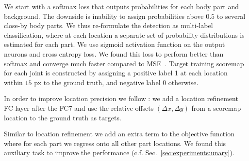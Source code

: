 We start with a softmax loss that outputs probabilities for each body
part and background. The downside is inability
to assign probabilities above $0.5$ to several close-by body parts. We
thus re-formulate the detection as multi-label classification, where
at each location a separate set of probability distributions is
estimated for each part.
We use sigmoid activation function on the output neurons and cross
entropy loss. We found this loss to perform better than softmax and
converge much faster compared to MSE~\cite{tompson14nips}. Target
training scoremap for each joint is constructed by assigning a
positive label 1 at each location within $15$ px to the ground truth,
and negative label 0 otherwise.


 In order to improve location
precision we follow \cite{girshickICCV15fastrcnn}: we add a location
refinement FC layer after the FC7 and use the relative offsets
$(\Delta x,\Delta y)$ from a scoremap location to the ground truth as
targets.


 Similar to location
refinement we add an extra term to the objective function where for
each part we regress onto all other part locations. We found this
auxiliary task to improve the performance
(c.f. Sec.~\ref{sec:experiments:unary}).

